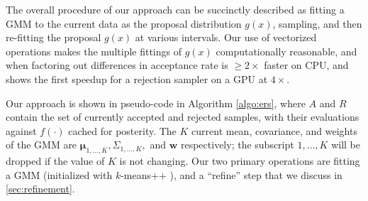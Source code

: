 \documentclass{ecai}  %
\begin{document}
The overall procedure of our approach can be succinctly described as fitting a GMM to the current data as the proposal distribution $g(x)$, sampling, and then re-fitting the proposal $g(x)$ at various intervals. Our use of vectorized operations makes the multiple fittings of $g(x)$ computationally reasonable, and when factoring out differences in acceptance rate is $\geq 2\times$ faster on CPU, and shows the first speedup for a rejection sampler on a GPU at $4\times$. 

Our approach is shown in pseudo-code in Algorithm \ref{algo:ers}, where $A$ and $R$ contain the set of currently accepted and rejected samples, with their evaluations against $f(\cdot)$ cached for posterity. The $K$ current mean, covariance, and weights of the GMM are $\bm{\mu}_{1, \ldots, K}, \Sigma_{1, \ldots, K},$ and $\bm{w}$ respectively; the subscript ${1, \ldots, K}$ will be dropped if the value of $K$ is not changing. Our two primary operations are fitting a GMM (initialized with $k$-means++ \cite{Arthur2007,Raff_2021_kmeans}), and a ``refine'' step that we discuss in \autoref{sec:refinement}. 
\end{document}
